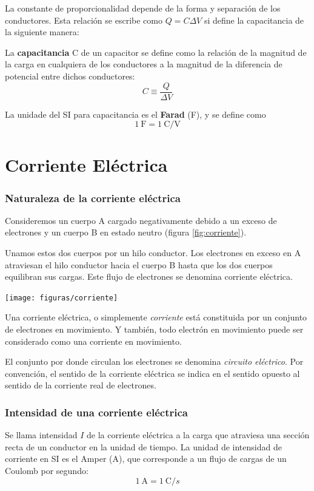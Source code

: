 \documentclass{article}
\begin{document}
La constante de proporcionalidad depende de la forma y separación de los conductores. Esta relación se escribe como $Q = C \Delta V$ si define la capacitancia de la siguiente manera:

La \textbf{capacitancia} C de un capacitor se define como la relación de la magnitud de
la carga en cualquiera de los conductores a la magnitud de la diferencia de potencial
entre dichos conductores:
$$C \equiv \frac{Q}{\Delta V}$$


La unidade del SI para capacitancia es el \textbf{Farad} (F), y se define como $$1~\textrm{F} = 1~ \textrm{C}/\textrm{V}$$



\pagebreak
\section{Corriente Eléctrica}
\subsubsection{Naturaleza de la corriente eléctrica}
Consideremos un cuerpo A cargado negativamente debido a un exceso de electrones y un cuerpo B en estado neutro (figura \ref{fig:corriente}).

Unamos estos dos cuerpos por un hilo conductor. Los electrones en exceso en A atraviesan el hilo conductor hacia el cuerpo B hasta que los dos cuerpos equilibran sus cargas. Este flujo de electrones se denomina corriente eléctrica.



\begin{center}
	\texttt{[image: figuras/corriente]}
\label{fig:corriente}
\end{center}

Una corriente eléctrica, o simplemente \emph{corriente} está constituida por un conjunto de electrones en movimiento. Y también, todo electrón en movimiento puede ser considerado como una corriente en movimiento.

El conjunto por donde circulan los electrones se denomina \emph{circuito eléctrico}. Por convención, el sentido de la corriente eléctrica se indica en el sentido opuesto al sentido de la corriente real de electrones.

\subsubsection*{Intensidad de una corriente eléctrica}
Se llama intensidad $I$ de la corriente eléctrica a la carga que atraviesa una sección recta de un conductor en la unidad de tiempo. La unidad de intensidad de corriente en SI es el Amper (A), que corresponde a un flujo de cargas de un Coulomb por segundo:
$$ 1~\textrm{A} = 1~\textrm{C}/s $$
\end{document}
